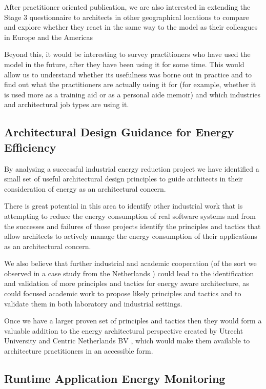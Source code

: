 After practitioner oriented publication, we are also interested in extending the Stage 3 questionnaire to architects in other geographical locations to compare and explore whether they react in the same way to the model as their colleagues in Europe and the Americas

Beyond this, it would be interesting to survey practitioners who have used the model in the future, after they have been using it for some time.  This would allow us to understand whether its usefulness was borne out in practice and to find out what the practitioners are actually using it for (for example, whether it is used more as a training aid or as a personal aide memoir) and which industries and architectural job types are using it.

\subsection{Architectural Design Guidance for Energy Efficiency}

By analysing a successful industrial energy reduction project we have identified a small set of useful architectural design principles to guide architects in their consideration of energy as an architectural concern.  

There is great potential in this area to identify other industrial work that is attempting to reduce the energy consumption of real software systems and from the successes and failures of those projects identify the principles and tactics that allow architects to actively manage the energy consumption of their applications as an architectural concern.  

We also believe that further industrial and academic cooperation (of the sort we observed in a case study from the Netherlands \cite{jagroep2016-comparingreleases}) could lead to the identification and validation of more principles and tactics for energy aware architecture, as could focused academic work to propose likely principles and tactics and to validate them in both laboratory and industrial settings.

Once we have a larger proven set of principles and tactics then they would form a valuable addition to the energy architectural perspective created by Utrecht University and Centric Netherlands BV \cite{jagroep2017-energyperspective}, which would make them available to architecture practitioners in an accessible form.

\subsection{Runtime Application Energy Monitoring}

